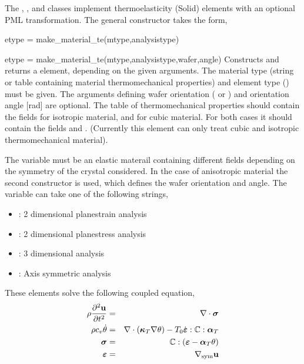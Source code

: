 The , , 
and 
classes implement thermoelasticity (Solid) elements with an optional PML
transformation. 
The general constructor takes the form,
\begin{codelist}
  \item[etype = make\_material\_te(mtype,analysistype)]
  \item[etype = make\_material\_te(mtype,analysistype,wafer,angle)]
    Constructs and returns a  element, depending on the
    given arguments. The material type  (string or table containing
    material thermomechanical properties) and element type
    () must be given. 
    The arguments defining wafer orientation ( or
    ) and orientation angle  [rad] are optional.
    The table of thermomechanical properties  should contain the 
    fields  for isotropic material, and  for cubic material. For both cases it should contain the fields
     and .
    (Currently this element can only treat cubic and isotropic thermomechanical
     material).
\end{codelist}
The variable  must be an elastic materail containing
different fields depending on the symmetry of the crystal considered.
In the case of anisotropic material the second constructor is used,
which defines the wafer orientation and angle.
The variable  can take one of the 
following strings,
\begin{itemize}
\item {}: 2 dimensional planestrain analysis
\item {}: 2 dimensional planestress analysis
\item {}: 3 dimensional analysis
\item {}: Axis symmetric analysis
\end{itemize}
These elements solve the following coupled equation,
\begin{eqnarray}
\rho \frac{\partial^2 \mathbf{u}}{\partial t^2}
&=& \mathbf{\nabla}\cdot\boldsymbol{\sigma} \\
\rho c_v \dot{\theta} 
&=& \mathbf{\nabla}\cdot\left(\boldsymbol{\kappa}_T\mathbf{\nabla} \theta\right)
   - T_0 \dot{\boldsymbol{\varepsilon}}:\mathbb{C}:\boldsymbol{\alpha}_T\\
\boldsymbol{\sigma} &=& \mathbb{C}:\left(\boldsymbol{\varepsilon} - \boldsymbol{\alpha}_T \theta \right)\\
\boldsymbol{\varepsilon} &=& \mathbf{\nabla}_\text{sym}\mathbf{u}
\end{eqnarray}
